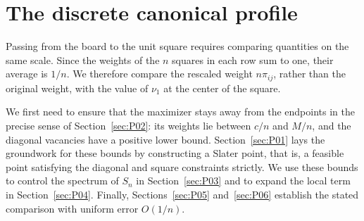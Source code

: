 \section{The discrete canonical profile}\label{sec:perfil}

Passing from the board to the unit square requires comparing quantities on the same scale.
Since the weights of the $n$ squares in each row sum to one, their average is $1/n$. We therefore compare
the rescaled weight $n\pi_{ij}$, rather than the original weight, with the value of $\nu_1$ at the center of
the square.

We first need to ensure that the maximizer stays away from the endpoints in the precise sense of
Section~\ref{sec:P02}: its weights lie between $c/n$ and $M/n$, and the diagonal vacancies
have a positive lower bound. Section~\ref{sec:P01} lays the groundwork for these bounds
by constructing a Slater point, that is, a feasible point satisfying the diagonal and square constraints
strictly.
We use these bounds to control the spectrum of $S_n$ in Section~\ref{sec:P03} and to expand
the local term in Section~\ref{sec:P04}. Finally, Sections~\ref{sec:P05}
and~\ref{sec:P06} establish the stated comparison with uniform error $O(1/n)$.
